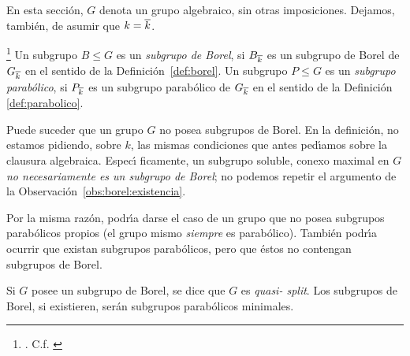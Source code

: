 En esta secci\'{o}n, $G$ denota un grupo algebraico, sin otras imposiciones.
Dejamos, tambi\'{e}n, de asumir que $k=\overline{k}$.

\begin{defBorelYParabolicos}\label{def:borelyparabolicos}
	\footnote{
		\cite[Definition~1.29]{GetzHahnAutomorphicRepresentations}.
		C.f. \cite[\S~17.66]{MilneAlgebraicGroups}
	}
	Un subgrupo $B\leq G$ es un \emph{subgrupo de Borel}, si
	$B_{\overline{k}}$ es un subgrupo de Borel de $G_{\overline{k}}$ en el
	sentido de la Definici\'{o}n~\ref{def:borel}. Un subgrupo $P\leq G$ es
	un \emph{subgrupo parab\'{o}lico}, si $P_{\overline{k}}$ es un subgrupo
	parab\'{o}lico de $G_{\overline{k}}$ en el sentido de la Definici\'{o}n~%
	\ref{def:parabolico}.
\end{defBorelYParabolicos}

\begin{obsBorelYParabolicos}\label{obs:borelyparabolicos:borel}
	Puede suceder que un grupo $G$ no posea subgrupos de Borel. En la
	definici\'{o}n, no estamos pidiendo, sobre $k$, las mismas condiciones
	que antes ped\'{\i}amos sobre la clausura algebraica. Espec\'{\i}%
	ficamente, un subgrupo soluble, conexo maximal en $G$ \emph{no %
	necesariamente es un subgrupo de Borel}; no podemos repetir el
	argumento de la Observaci\'{o}n~\ref{obs:borel:existencia}.
\end{obsBorelYParabolicos}

\begin{obsBorelYParabolicos}\label{obs:borelyparabolicos:parabolicos}
	Por la misma raz\'{o}n, podr\'{\i}a darse el caso de un grupo que
	no posea subgrupos parab\'{o}licos propios (el grupo mismo
	\emph{siempre} es parab\'{o}lico). Tambi\'{e}n podr\'{\i}a ocurrir que
	existan subgrupos parab\'{o}licos, pero que \'{e}stos no contengan
	subgrupos de Borel.
\end{obsBorelYParabolicos}

\begin{defQuasiSplit}\label{def:quasisplit}
	Si $G$ posee un subgrupo de Borel, se dice que $G$ es \emph{quasi-%
	split}. Los subgrupos de Borel, si existieren, ser\'{a}n subgrupos
	parab\'{o}licos minimales.
\end{defQuasiSplit}
